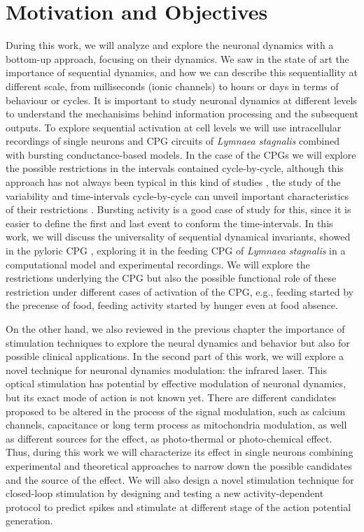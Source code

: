 \chapter{Motivation and Objectives}\label{c-review}
During this work, we will analyze and explore the neuronal dynamics with a bottom-up approach, focusing on their dynamics. We saw in the state of art the importance of sequential dynamics, and how we can describe this sequentiallity at different scale, from milliseconds (ionic channels) to hours or days in terms of behaviour or cycles. It is important to study neuronal dynamics at different levels to understand the mechanisims behind information processing and the subsequent outputs. To explore sequential activation at cell levels we will use intracellular recordings of single neurons and CPG circuits of \textit{Lymnaea stagnalis} combined with bursting conductance-based models. In the case of the CPGs we will explore the possible restrictions in the intervals contained cycle-by-cycle, although this approach has not always been typical in this kind of studies \cite{nadim_inter-animal_2022}, the study of the variability and time-intervals cycle-by-cycle can unveil important characteristics of their restrictions \parencite{elices_robust_2019}. Bursting activity is a good case of study for this, since it is easier to define the first and last event to conform the time-intervals. In this work, we will discuss the universality of sequential dynamical invariants, showed in the pyloric CPG \parencite{elices_robust_2019}, exploring it in the feeding CPG of \textit{Lymnaea stagnalis} in a computational model and experimental recordings. We will explore the restrictions underlying the CPG but also the possible functional role of these restriction under different cases of activation of the CPG, e.g., feeding started by the precense of food, feeding activity started by hunger even at food absence. 

On the other hand, we also reviewed in the previous chapter the importance of stimulation techniques to explore the neural dynamics and behavior but also for possible clinical applications. In the second part of this work, we will explore a novel technique for neuronal dynamics modulation: the infrared laser. This optical stimulation has potential by effective modulation of neuronal dynamics, but its exact mode of action is not known yet. There are different candidates proposed to be altered in the process of the signal modulation, such as calcium channels, capacitance or long term process as mitochondria modulation, as well as different sources for the effect, as photo-thermal or photo-chemical effect. Thus, during this work we will characterize its effect in single neurons combining experimental and theoretical approaches to narrow down the possible candidates and the source of the effect. We will also design a novel stimulation technique for closed-loop stimulation by designing and testing a new activity-dependent protocol to predict spikes and stimulate at different stage of the action potential generation. 

